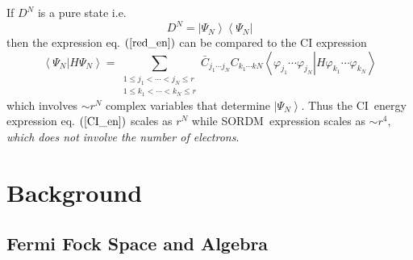\documentclass[aps,preprint]{revtex4}%
\begin{document}
If $D^{N}$ is a pure state i.e.
\begin{equation}
D^{N}=\left\vert \Psi_{N}\right\rangle \left\langle \Psi_{N}\right\vert
\end{equation}
then the expression eq. $\left(  \ref{red_en}\right)  $ can be compared to the
CI expression
\begin{equation}
\left\langle \Psi_{N}\left\vert H\Psi_{N}\right.  \right\rangle =\sum
_{\substack{1\leq j_{1}<\cdots<j_{N}\leq r\\1\leq k_{1}<\cdots<k_{N}\leq
r}}\bar{C}_{j_{1}\cdots j_{N}}C_{k_{1}\cdots kN}\left\langle \varphi_{j_{1}%
}\cdots\varphi_{j_{N}}\left\vert H\varphi_{k_{1}}\cdots\varphi_{k_{N}}\right.
\right\rangle \label{CI_en}%
\end{equation}
which involves $\sim r^{N}$ complex variables that determine $\left\vert
\Psi_{N}\right\rangle .$ Thus the CI\ energy expression eq. $\left(
\ref{CI_en}\right)  $ scales as $r^{N}$ while SORDM\ expression scales as
$\sim r^{4},$ \emph{which does not involve the number of electrons}.

\section{Background}

\subsection{Fermi Fock Space and Algebra}
\end{document}
